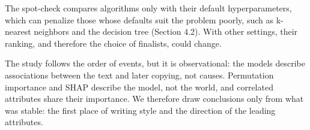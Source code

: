 The spot-check compares algorithms only with their default
hyperparameters, which can penalize those whose defaults suit the
problem poorly, such as k-nearest neighbors and the decision tree
(Section 4.2). With other settings, their ranking, and therefore the
choice of finalists, could change.

The study follows the order of events, but it is observational: the
models describe associations between the text and later copying, not
causes. Permutation importance and SHAP describe the model, not the
world, and correlated attributes share their importance. We therefore
draw conclusions only from what was stable: the first place of writing
style and the direction of the leading attributes.
